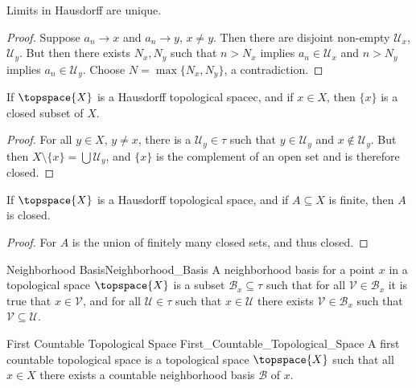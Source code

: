 \documentclass{article}                                                        %
\begin{document}
        \begin{theorem}
            Limits in Hausdorff are unique.
        \end{theorem}
        \begin{proof}
            Suppose $a_{n}\rightarrow{x}$ and $a_{n}\rightarrow{y}$, $x\ne{y}$.
            Then there are disjoint non-empty $\mathcal{U}_{x}$,
            $\mathcal{U}_{y}$. But then there exists $N_{x},N_{y}$ such that
            $n>N_{x}$ implies $a_{n}\in\mathcal{U}_{x}$ and $n>N_{y}$ implies
            $a_{n}\in\mathcal{U}_{y}$. Choose $N=\max\{N_{x},N_{y}\}$, a
            contradiction.
        \end{proof}
        \begin{theorem}
            If $\topspace{X}$ is a Hausdorff topological spacec, and if
            $x\in{X}$, then $\{x\}$ is a closed subset of $X$.
        \end{theorem}
        \begin{proof}
            For all $y\in{X}$, $y\ne{x}$, there is a $\mathcal{U}_{y}\in\tau$
            such that $y\in\mathcal{U}_{y}$ and $x\notin\mathcal{U}_{y}$. But
            then $X\setminus\{x\}=\bigcup\mathcal{U}_{y}$, and $\{x\}$ is
            the complement of an open set and is therefore closed.
        \end{proof}
        \begin{theorem}
            If $\topspace{X}$ is a Hausdorff topological space, and if
            $A\subseteq{X}$ is finite, then $A$ is closed.
        \end{theorem}
        \begin{proof}
            For $A$ is the union of finitely many closed sets, and thus closed.
        \end{proof}
        \begin{fdefinition}{Neighborhood Basis}{Neighborhood_Basis}
            A neighborhood basis for a point $x$ in a topological space
            $\topspace{X}$ is a subset $\mathcal{B}_{x}\subseteq\tau$ such that
            for all $\mathcal{V}\in\mathcal{B}_{x}$ it is true that
            $x\in\mathcal{V}$, and for all $\mathcal{U}\in\tau$ such that
            $x\in\mathcal{U}$ there exists $\mathcal{V}\in\mathcal{B}_{x}$ such
            that $\mathcal{V}\subseteq\mathcal{U}$.
        \end{fdefinition}
        \begin{fdefinition}{First Countable Topological Space}
                           {First_Countable_Topological_Space}
            A first countable topological space is a topological space
            $\topspace{X}$ such that all $x\in{X}$ there exists a countable
            neighborhood basis $\mathcal{B}$ of $x$.
        \end{fdefinition}
\end{document}
